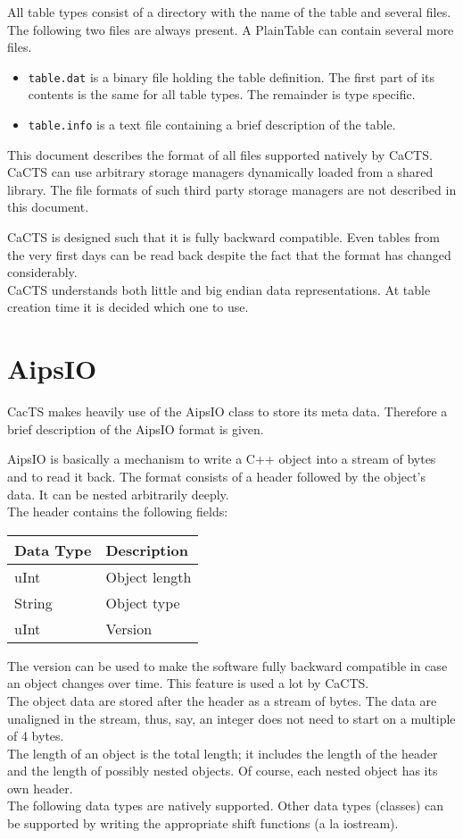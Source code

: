 All table types consist of a directory with the name of the table and
several files. The following two files are always present.
A PlainTable can contain several more files.
\begin{itemize}
\item
\texttt{table.dat} is a binary file holding the table definition. The
first part of its contents is the same for all table types. The
remainder is type specific.
\item
\texttt{table.info} is a text file containing a brief
description of the table.
\end{itemize}

This document describes the format of all files supported natively by CaCTS.
CaCTS can use arbitrary storage managers dynamically loaded
from a shared library. The file formats of such third party storage
managers are not described in this document.

CaCTS is designed such that it is fully backward compatible. Even
tables from the very first days can be read back despite the fact that
the format has changed considerably.
\\CaCTS understands both little and big endian data
representations. At table creation time it is decided which one to use.


\section{AipsIO}
CacTS makes heavily use of the AipsIO class to store its meta
data. Therefore a brief description of the AipsIO format is given.

AipsIO is basically a mechanism to write a C++ object into a
stream of bytes and to read it back. The format consists of a header followed
by the object's data. It can be nested arbitrarily deeply.
\\The header contains the following fields:

\vspace{0.15in}
\begin{tabular}{|l|l|} \hline
  Data Type & Description \\ \hline\hline
  uInt & Object length \\
  String & Object type \\
  uInt & Version \\
  \hline
\end{tabular}
\vspace{0.15in}

The version can be used to make the software fully backward compatible
in case an object changes over time. This feature is used a lot by CaCTS.
\\The object data are stored after the header as a stream of
bytes. The data are unaligned in the stream, thus, say, an integer
does not need to start on a multiple of 4 bytes.
\\The length of an object is the total length; it includes the length
of the header and the length of possibly nested objects. Of course, each nested
object has its own header.
\\The following data types are natively supported. Other data types
(classes) can be supported by writing the appropriate shift functions
(a la iostream).

